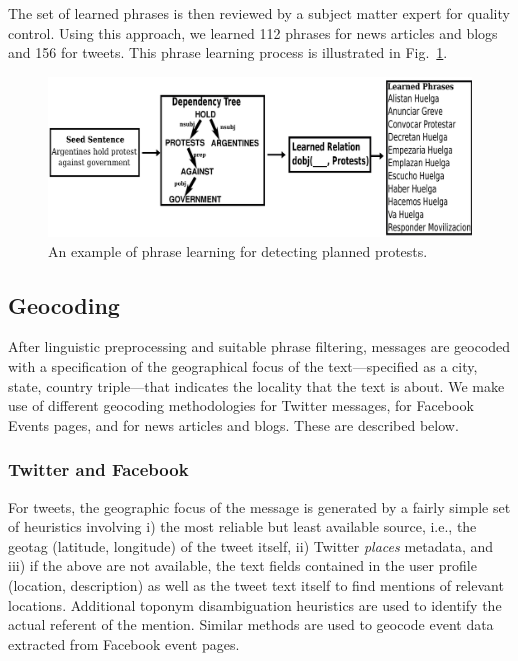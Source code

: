 \documentclass[letterpaper]{article}
\begin{document}
The set of learned phrases is then reviewed by a subject matter expert for quality control.  
Using this approach, we learned 112 phrases for news articles and blogs and 156 for tweets.  
This phrase learning process is illustrated in Fig.~\ref{fig:phraselearning}.

\begin{figure}
  \centering
\includegraphics[scale=0.2]{figures/phraseLearning}
\caption{An example of phrase learning for detecting planned protests.}
\label{fig:phraselearning}
\end{figure}

\subsection{Geocoding}
\label{subsection:geocoding}
After linguistic preprocessing and suitable phrase filtering,
messages are geocoded with a
specification of the geographical focus of the text---specified as a
city, state, country triple---that indicates the locality that the
text is about. We make use of different geocoding methodologies
for Twitter messages, for Facebook Events pages, and for news articles and blogs.
These are described below.

\subsubsection{Twitter and Facebook}
For tweets, the geographic focus of the message is generated by a fairly simple
set of heuristics involving i) the most reliable but least available
source, i.e., the geotag (latitude, longitude) of the tweet itself, ii)
Twitter {\it places} metadata, and iii) if the above are not available,
the text fields contained in the user profile (location, description) as
well as the tweet text itself to find mentions of relevant locations.
Additional toponym disambiguation heuristics are used to identify the
actual referent of the mention.  Similar methods are used to geocode
event data extracted from Facebook event pages.  
\end{document}
